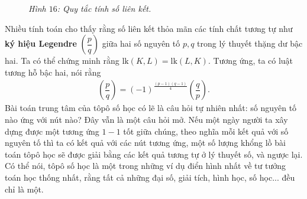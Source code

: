 \begin{multicols}{2}
\begin{figure}[H]
		\caption{\small\textit{\color{duongvaotoanhoc}Hình $16$: Quy tắc tính số liên kết.}}
		\vspace*{-10pt}
	\end{figure}
	Nhiều tính toán cho thấy rằng số liên kết thỏa mãn các tính chất tương tự như {\bf\color{duongvaotoanhoc} ký hiệu Legendre} $\left(\dfrac{p}{q}\right)$ giữa hai số nguyên tố $p, q$ trong lý thuyết thặng dư bậc hai. Ta có thể chứng minh rằng $\text{lk}(K,L) = \text{lk}(L,K)$. Tương ứng, ta có luật tương hỗ bậc hai, nói rằng 
	\begin{align*}
		\left(\dfrac{p}{q}\right) = (-1)^{\tfrac{(p-1)(q-1)}{4}}\left(\dfrac{q}{p}\right).
	\end{align*}
	Bài toán trung tâm của tôpô số học có lẽ là câu hỏi tự nhiên nhất: số nguyên tố nào ứng với nút nào? Đây vẫn là một câu hỏi mở. Nếu một ngày người ta xây dựng được một tương ứng $1-1$ tốt giữa chúng, theo nghĩa mỗi kết quả với số nguyên tố thì ta có kết quả với các nút tương ứng, một số lượng khổng lồ bài toán tôpô học sẽ được giải bằng các kết quả tương tự ở lý thuyết số, và ngược lại. Có thể nói, tôpô số học là một trong những ví dụ điển hình nhất về tư tưởng toán học thống nhất, rằng tất cả những đại số, giải tích, hình học, số học... đều chỉ là một.
\end{multicols}